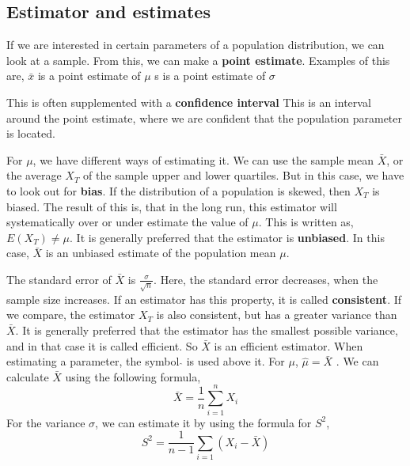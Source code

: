 \subsection{Estimator and estimates}
If we are interested in certain parameters of a population distribution, we can look at a sample. From this, we can make a \textbf{point estimate}. 
\newline
Examples of this are, 
\newline
$\bar{x}$ is a point estimate of $\mu$
\newline
s is a point estimate of $\sigma$
\newline

This is often supplemented with a \textbf{confidence interval}
\newline
This is an interval around the point estimate, where we are confident that the population parameter is located.
\newline

For $\mu$, we have different ways of estimating it. We can use the sample mean $\bar{X}$, or the average $X_T$ of the sample upper and lower quartiles. 
But in this case, we have to look out for \textbf{bias}. If the distribution of a population is skewed, then $X_T$ is biased. The result of this is, that in the long run, this estimator will systematically over or under estimate the value of $\mu$. This is written as,
\newline
$E(X_T) \neq \mu$.
\newline
It is generally preferred that the estimator is \textbf{unbiased}. In this case, $\bar{X}$ is an unbiased estimate of the population mean $\mu$.
\newline

The standard error of $\bar{X}$ is $\frac{\sigma}{\sqrt{n}}$. Here, the standard error decreases, when the sample size increases. If an estimator has this property, it is called \textbf{consistent}. If we compare, the estimator $X_T$ is also consistent, but has a greater variance than $\bar{X}$. 
\newline
It is generally preferred that the estimator has the smallest possible variance, and in that case it is called efficient. So $\bar{X}$ is an efficient estimator.
\newline
When estimating a parameter, the symbol $\hat{}$ is used above it. For $\mu$, $\hat{\mu} = \bar{X}$ .
\newline
We can calculate $\bar{X}$ using the following formula,
$$\bar{X}=\frac{1}{n} \sum_{i=1}^{n}X_i$$   
\newline
For the variance $\sigma$, we can estimate it by using the formula for $S^2$,
$$S^2=\frac{1}{n-1} \sum_{i=1}(X_i-\bar{X})$$
